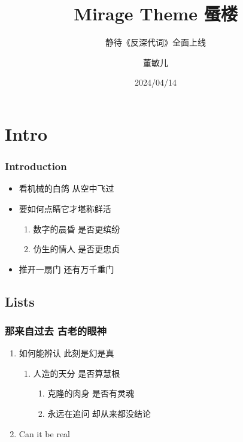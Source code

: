 \documentclass[aspectratio=1610,linespread=1.4,t]{ctexbeamer}
\title{Mirage Theme 蜃楼}
\subtitle{静待《反深代词》全面上线}
\author{董敏儿}
\institute{（懂自懂）}
\date{2024/04/14}
\begin{document}
\frame{\maketitle}

\section{Intro}
\begin{frame}
\frametitle{Introduction}

\begin{itemize}
    \item 看机械的白鸽\faDove{} 从空中飞过 
    \item 要如何点睛\faEye[regular] 它才堪称鲜活

\begin{enumerate}
    \item 数字的晨昏\faCloudSun{} 是否更缤纷\faCloudMoon
    \item 仿生的情人\faGrinHearts{} 是否更忠贞\faGrin*[regular]
\end{enumerate}

    \item 推开一扇门\faDoorOpen{} 还有万千重门\faDoorClosed{\small\faDoorClosed}{\footnotesize\faDoorClosed}{\scriptsize\faDoorClosed}{\tiny\faDoorClosed}
\end{itemize}

\end{frame}

\subsection{Lists}
\begin{frame}
\frametitle{那来自过去 古老的眼神}
    \begin{enumerate}
        \item 如何能辨认 此刻是幻是真
        \begin{enumerate}
	        \item 人造的天分 是否算慧根
	        \begin{enumerate}
		        \item 克隆的肉身 是否有灵魂
		        \item 永远在追问 却从来都没结论
	        \end{enumerate}
        \end{enumerate}
        \item \alert{Can it be real}
    \end{enumerate}

\end{frame}
\end{document}
